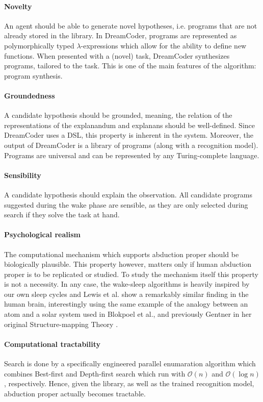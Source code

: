 \paragraph{Novelty} An agent should be able to generate novel hypotheses, i.e. programs that are not already stored in the library. In DreamCoder, programs are represented as polymorphically typed $\lambda$-expressions which allow for the ability to define new functions. When presented with a (novel) task, DreamCoder synthesizes programs, tailored to the task. This is one of the main features of the algorithm: program synthesis.

\paragraph{Groundedness} A candidate hypothesis should be grounded, meaning, the relation of the representations of the explanandum and explanans should be well-defined. Since DreamCoder uses a DSL, this property is inherent in the system. Moreover, the output of DreamCoder is a library of programs (along with a recognition model). Programs are universal and can be represented by any Turing-complete language.

\paragraph{Sensibility} A candidate hypothesis should explain the observation. All candidate programs suggested during the wake phase are sensible, as they are only selected during search if they solve the task at hand. 

\paragraph{Psychological realism} The computational mechanism which supports abduction proper should be biologically plausible. This property however, matters only if human abduction proper is to be replicated or studied. To study the mechanism itself this property is not a necessity. In any case, the wake-sleep algorithms is heavily inspired by our own sleep cycles and Lewis et al. show a remarkably similar finding in the human brain, interestingly using the same example of the analogy between an atom and a solar system used in Blokpoel et al., and previously Gentner in her original Structure-mapping Theory \cite{lewis2018memory,blokpoel2018deep, gentner1983structure}.

\paragraph{Computational tractability}
Search is done by a specifically engineered parallel enumaration algorithm which combines Best-first and Depth-first search which run with $\mathcal{O}(n)$ and $\mathcal{O}(\log n)$, respectively. Hence, given the library, as well as the trained recognition model, abduction proper actually becomes tractable.



